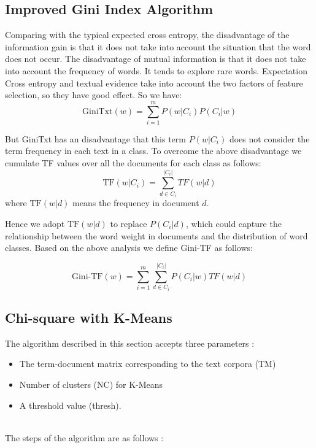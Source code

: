 \documentclass[a4paper, 14pt]{article}
\begin{document}
\begin{justify}
\begin{justify}
\end{justify}

\newpage
\subsection{Improved Gini Index Algorithm}
\begin{justify}

Comparing with the typical expected cross entropy, the
disadvantage of the information gain is that it does not take
into account the situation that the word does not occur. The
disadvantage of mutual information is that it does not take
into account the frequency of words. It tends to explore rare words. Expectation Cross
entropy and textual evidence take into account the two
factors of feature selection, so they have good effect. So we have:
\[\text{GiniTxt}(w) = \sum_{i=1}^{m}{P(w|C_{i})P(C_{i}|w)}\]

\justify
But GiniTxt \cite{giniindex} has an disadvantage that this term $P(w|C_{i})$ does
not consider the term frequency in each text in a class. To overcome the above disadvantage we cumulate TF values over all the documents for each class as follows:
\[\text{TF}(w|C_{i}) = \sum_{d \in C_{i}}^{|C_{i}|}{TF(w|d)}
\] 
\justify
where $\text{TF}(w|d)$ means the frequency in document $d$.

\justify
Hence we adopt $\text{TF}(w|d)$ to replace $P(C_{i}|d)$, which could capture the relationship between the word weight in documents and the distribution of word classes. Based on the above analysis we define Gini-TF \cite{giniimptf} as follows:

\[\text{Gini-TF}(w) = \sum_{i=1}^{m}{\sum_{d \in C_{i}}^{|C_i|}{P(C_{i}|w)TF(w|d)}}\]

\end{justify}

\subsection{Chi-square with K-Means}
\begin{justify}
The algorithm described in this section accepts three parameters :
\begin{itemize}

\item The term-document matrix corresponding to the text corpora (TM)
\item Number of clusters (NC) for K-Means
\item A threshold value (thresh).
\end{itemize}
\\
The steps of the algorithm are as follows : 





\end{justify}
\end{justify}
\end{document}
